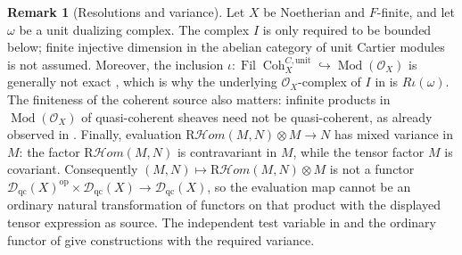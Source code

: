 \documentclass[11pt]{amsart}
\newcommand{\cO}{\mathcal{O}}
\newcommand{\Mod}{\operatorname{Mod}}
\newcommand{\op}{{\operatorname{op}}}
\newcommand{\Coh}{\operatorname{{Coh}}}
\newcommand{\Fil}{{\operatorname{Fil}}}
\newcommand{\RHom}{\mathrm R\mathcal Hom}
\newcommand{\Dqc}{\mathcal D_{\mathrm{qc}}}
\theoremstyle{plain}
\theoremstyle{definition}
\newtheorem{remark}[remark]{Remark}
\numberwithin{equation}{section}
\begin{document}
\begin{remark}[Resolutions and variance]\label{rem:resolution}
Let $X$ be Noetherian and $F$-finite, and let $\omega$ be a unit dualizing complex.
The complex $I$ is only required to be bounded below; finite injective dimension in the abelian category of unit Cartier modules is not assumed.
Moreover, the inclusion $\iota:\Fil\Coh^{C,\mathrm{unit}}_X\hookrightarrow\Mod(\cO_X)$ is generally not exact \cite[Remark 3.4.12]{Bau}, which is why the underlying $\cO_X$-complex of $I$ in  is $R\iota(\omega)$.
The finiteness of the coherent source also matters: infinite products in $\Mod(\cO_X)$ of quasi-coherent sheaves need not be quasi-coherent, as already observed in \cite[proof of Proposition 4.1.3]{Bau}.
Finally, evaluation $\RHom(M,N)\otimes M\to N$ has mixed variance in $M$: the factor $\RHom(M,N)$ is contravariant in $M$, while the tensor factor $M$ is covariant.
Consequently $(M,N)\mapsto\RHom(M,N)\otimes M$ is not a functor $\Dqc(X)^{\op}\times\Dqc(X)\to\Dqc(X)$, so the evaluation map cannot be an ordinary natural transformation of functors on that product with the displayed tensor expression as source.
The independent test variable in  and the ordinary functor of  give constructions with the required variance.
\end{remark}
\end{document}
